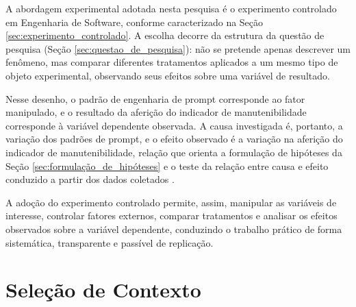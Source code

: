 
A abordagem experimental adotada nesta pesquisa é o experimento controlado em Engenharia de Software, conforme caracterizado na Seção \ref{sec:experimento_controlado}. A escolha decorre da estrutura da questão de pesquisa (Seção \ref{sec:questao_de_pesquisa}): não se pretende apenas descrever um fenômeno, mas comparar diferentes tratamentos aplicados a um mesmo tipo de objeto experimental, observando seus efeitos sobre uma variável de resultado.

Nesse desenho, o padrão de engenharia de prompt corresponde ao fator manipulado, e o resultado da aferição do indicador de manutenibilidade corresponde à variável dependente observada. A causa investigada é, portanto, a variação dos padrões de prompt, e o efeito observado é a variação na aferição do indicador de manutenibilidade, relação que orienta a formulação de hipóteses da Seção \ref{sec:formulação_de_hipóteses} e o teste da relação entre causa e efeito conduzido a partir dos dados coletados \cite{wohlin2024}.

A adoção do experimento controlado permite, assim, manipular as variáveis de interesse, controlar fatores externos, comparar tratamentos e analisar os efeitos observados sobre a variável dependente, conduzindo o trabalho prático de forma sistemática, transparente e passível de replicação.


\section{Seleção de Contexto}
\label{sec:contexto_do_estudo}


